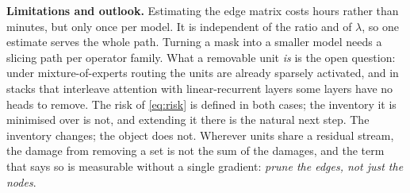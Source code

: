 \textbf{Limitations and outlook.} Estimating the edge matrix costs hours rather than minutes, but only
once per model. It is independent of the ratio and of $\lambda$, so one estimate serves the whole
path. Turning a mask into a smaller model needs a slicing path per operator family. What a removable unit
\emph{is} is the open question: under mixture-of-experts routing the units are already sparsely
activated, and in stacks that interleave attention with linear-recurrent layers some layers have no
heads to remove. The risk of \cref{eq:risk} is defined in both cases; the inventory it is minimised
over is not, and extending it there is the natural next step. The inventory changes; the object does not. Wherever units share a
residual stream, the damage from removing a set is not the sum of the damages, and the term that says so
is measurable without a single gradient: \emph{prune the edges, not just the nodes}.

